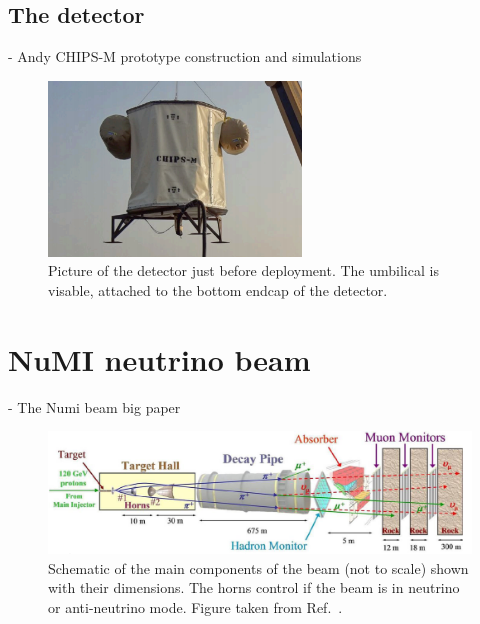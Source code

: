 \subsection{The \chipsm detector} %
\label{sec:chips_concept_m} %

- Andy CHIPS-M prototype construction and simulations~\cite{perch2015}

\begin{figure} %
    \includegraphics[width=0.6\textwidth]{diagrams/4-chips/chips_m.png}
    \caption[Picture of the \chipsm detector.]
    {Picture of the \chipsm detector just before deployment. The umbilical is visable, attached to
        the bottom endcap of the detector.}
    \label{fig:chips_m}
\end{figure}

\section{NuMI neutrino beam} %
\label{sec:chips_numi} %

- The Numi beam big paper~\cite{adamson2016}

\begin{figure} %
    \includegraphics[width=\textwidth]{diagrams/4-chips/numi_beam.png}
    \caption[Schematic of the \numi beam.]
    {Schematic of the main components of the \numi beam (not to scale) shown with their
        dimensions. The horns control if the beam is in neutrino or anti-neutrino mode. Figure
        taken from Ref.~\cite{adamson2016}.}
    \label{fig:numi_beam}
\end{figure}

